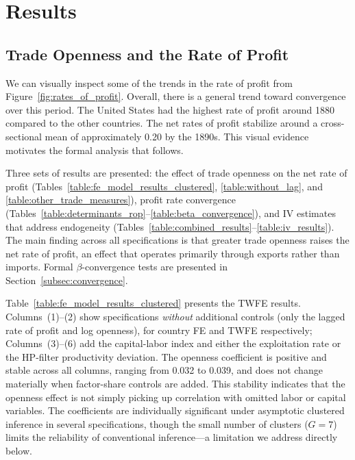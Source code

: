 \documentclass[10pt]{article}
\begin{document}
\section{Results}
\label{sec:results}

\subsection{Trade Openness and the Rate of Profit}

We can visually inspect some of the trends in the rate of profit from Figure~\ref{fig:rates_of_profit}. Overall, there is a general trend toward convergence over this period. The United States had the highest rate of profit around 1880 compared to the other countries. The net rates of profit stabilize around a cross-sectional mean of approximately 0.20 by the 1890s. This visual evidence motivates the formal analysis that follows.

\par Three sets of results are presented: the effect of trade openness on the net rate of profit (Tables~\ref{table:fe_model_results_clustered}, \ref{table:without_lag}, and \ref{table:other_trade_measures}), profit rate convergence (Tables~\ref{table:determinants_rop}--\ref{table:beta_convergence}), and IV estimates that address endogeneity (Tables~\ref{table:combined_results}--\ref{table:iv_results}). The main finding across all specifications is that greater trade openness raises the net rate of profit, an effect that operates primarily through exports rather than imports. Formal $\beta$-convergence tests are presented in Section~\ref{subsec:convergence}.

\par Table~\ref{table:fe_model_results_clustered} presents the TWFE results. Columns~(1)--(2) show specifications \emph{without} additional controls (only the lagged rate of profit and log openness), for country FE and TWFE respectively; Columns~(3)--(6) add the capital-labor index and either the exploitation rate or the HP-filter productivity deviation. The openness coefficient is positive and stable across all columns, ranging from 0.032 to 0.039, and does not change materially when factor-share controls are added. This stability indicates that the openness effect is not simply picking up correlation with omitted labor or capital variables. The coefficients are individually significant under asymptotic clustered inference in several specifications, though the small number of clusters ($G=7$) limits the reliability of conventional inference---a limitation we address directly below.
\end{document}
